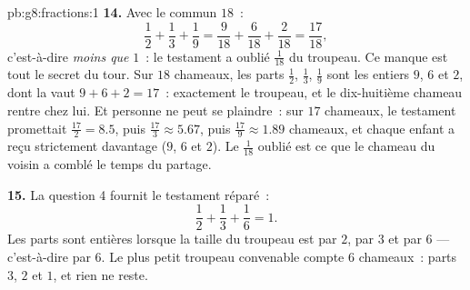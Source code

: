 \begin{solution}{pb:g8:fractions:1}
\textbf{14.} Avec le  commun $18$~:
\[
\frac12 + \frac13 + \frac19
= \frac{9}{18} + \frac{6}{18} + \frac{2}{18}
= \frac{17}{18} ,
\]
c'est-à-dire \emph{moins que} $1$~: le testament a oublié
$\frac{1}{18}$ du troupeau. Ce manque est tout le secret du tour.
Sur $18$ chameaux, les parts $\frac12$, $\frac13$, $\frac19$ sont
les entiers $9$, $6$ et $2$, dont la  vaut
$9 + 6 + 2 = 17$~: exactement le troupeau, et le dix-huitième
chameau rentre chez lui. Et personne ne peut se plaindre~: sur $17$
chameaux, le testament promettait $\frac{17}{2} = 8.5$, puis
$\frac{17}{3} \approx 5.67$, puis $\frac{17}{9} \approx 1.89$
chameaux, et chaque enfant a reçu strictement davantage ($9$, $6$ et
$2$). Le $\frac{1}{18}$ oublié est ce que le chameau du voisin a
comblé le temps du partage.

\textbf{15.} La question 4 fournit le testament réparé~:
\[
\frac12 + \frac13 + \frac16 = 1 .
\]
Les parts sont entières lorsque la taille du troupeau est 
par $2$, par $3$ et par $6$ --- c'est-à-dire  par $6$. Le
plus petit troupeau convenable compte $6$ chameaux~: parts $3$, $2$
et $1$, et rien ne reste.
\end{solution}
